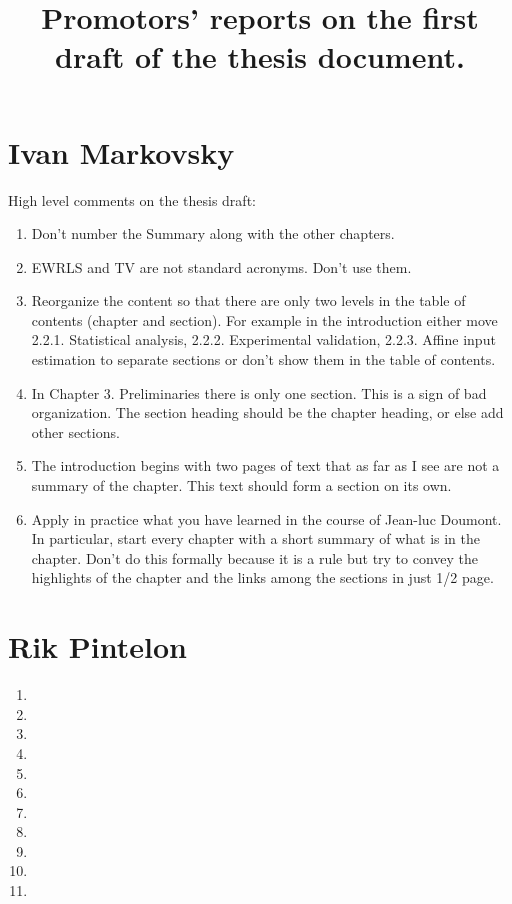\documentclass[11pt]{article}
\date{\vspace{-10ex}}
\begin{document}
\title{Promotors' reports on the first draft of the thesis document.} 

\maketitle


\section*{Ivan Markovsky}

High level comments on the thesis draft:

\begin{enumerate}

\item Don't number the Summary along with the other chapters.

\item EWRLS and TV are not standard acronyms. Don't use them.

\item Reorganize the content so that there are only two levels in the
table of contents (chapter and section). For example in the introduction
either move 2.2.1. Statistical analysis, 2.2.2. Experimental validation,
2.2.3. Affine input estimation to separate sections or don't show them
in the table of contents.
\item In Chapter 3. Preliminaries there is only one section. This is a sign
of bad organization. The section heading should be the chapter heading,
or else add other sections.
\item  The introduction begins with two pages of text that as far as I see
are not a summary of the chapter. This text should form a section on its
own.
\item  Apply in practice what you have learned in the course of Jean-luc
Doumont. In particular, start every chapter with a short summary of what
is in the chapter. Don't do this formally because it is a rule but try
to convey the highlights of the chapter and the links among the sections
in just 1/2 page.

\end{enumerate}

\section*{Rik Pintelon}



\begin{enumerate}

\item 


\item 

\item 

\item 

\item 

\item 

\item 

\item 

\item 

\item 

\item 

\end{enumerate}
\end{document}
